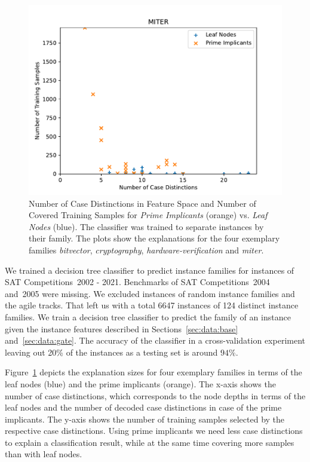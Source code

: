 \documentclass[a4paper, USenglish, cleveref, autoref, thm-restate]{lipics-v2021}
\theoremstyle{definition}
\begin{document}
\begin{figure}
\begin{minipage}{.49\linewidth}
\includegraphics[width=\linewidth]{fig/fam_miter_leafs23_imps23.pdf}
\end{minipage}
\caption{Number of Case Distinctions in Feature Space and Number of Covered Training Samples for \emph{Prime Implicants} (orange) vs. \emph{Leaf Nodes} (blue). The classifier was trained to separate instances by their family. The plots show the explanations for the four exemplary families \emph{bitvector},  \emph{cryptography}, \emph{hardware-verification} and \emph{miter}.}
\label{fig:eval:families}
\end{figure}

We trained a decision tree classifier to predict instance families for instances of SAT Competitions~2002 - 2021. 
Benchmarks of SAT Competitions~2004 and~2005 were missing. 
We excluded instances of random instance families and the agile tracks. 
That left us with a total 6647 instances of 124 distinct instance families. 
We train a decision tree classifier to predict the family of an instance given the instance features described in Sections~\ref{sec:data:base} and~\ref{sec:data:gate}. 
The accuracy of the classifier in a cross-validation experiment leaving out 20\% of the instances as a testing set is around $94\%$. 

Figure~\ref{fig:eval:families} depicts the explanation sizes for four exemplary families in terms of the leaf nodes (blue) and the prime implicants (orange). 
The x-axis shows the number of case distinctions, which corresponds to the node depths in terms of the leaf nodes and the number of decoded case distinctions in case of the prime implicants. 
The y-axis shows the number of training samples selected by the respective case distinctions. 
Using prime implicants we need less case distinctions to explain a classification result, while at the same time covering more samples than with leaf nodes. 
\end{document}
